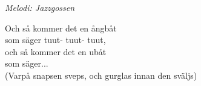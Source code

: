 {\footnotesize\textit{Melodi: Jazzgossen}}\par
\vspace{10pt}
Och så kommer det en ångbåt\\
som säger tuut- tuut- tuut,\\
och så kommer det en ubåt\\
som säger...\\
(Varpå snapsen sveps, och gurglas innan den sväljs)
